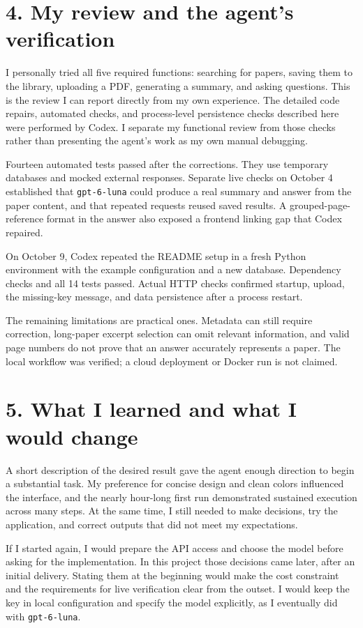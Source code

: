 \documentclass[10pt,letterpaper]{article}
\newcommand{\reportsection}[1]{\section*{\color{black}#1}}
\begin{document}
\reportsection{4. My review and the agent's verification}

I personally tried all five required functions: searching for papers, saving them to the library, uploading a PDF, generating a summary, and asking questions. This is the review I can report directly from my own experience. The detailed code repairs, automated checks, and process-level persistence checks described here were performed by Codex. I separate my functional review from those checks rather than presenting the agent's work as my own manual debugging.

Fourteen automated tests passed after the corrections. They use temporary databases and mocked external responses. Separate live checks on October 4 established that \texttt{gpt-6-luna} could produce a real summary and answer from the paper content, and that repeated requests reused saved results. A grouped-page-reference format in the answer also exposed a frontend linking gap that Codex repaired.

On October 9, Codex repeated the README setup in a fresh Python environment with the example configuration and a new database. Dependency checks and all 14 tests passed. Actual HTTP checks confirmed startup, upload, the missing-key message, and data persistence after a process restart.

The remaining limitations are practical ones. Metadata can still require correction, long-paper excerpt selection can omit relevant information, and valid page numbers do not prove that an answer accurately represents a paper. The local workflow was verified; a cloud deployment or Docker run is not claimed.

\reportsection{5. What I learned and what I would change}

A short description of the desired result gave the agent enough direction to begin a substantial task. My preference for concise design and clean colors influenced the interface, and the nearly hour-long first run demonstrated sustained execution across many steps. At the same time, I still needed to make decisions, try the application, and correct outputs that did not meet my expectations.

If I started again, I would prepare the API access and choose the model before asking for the implementation. In this project those decisions came later, after an initial delivery. Stating them at the beginning would make the cost constraint and the requirements for live verification clear from the outset. I would keep the key in local configuration and specify the model explicitly, as I eventually did with \texttt{gpt-6-luna}.
\end{document}
